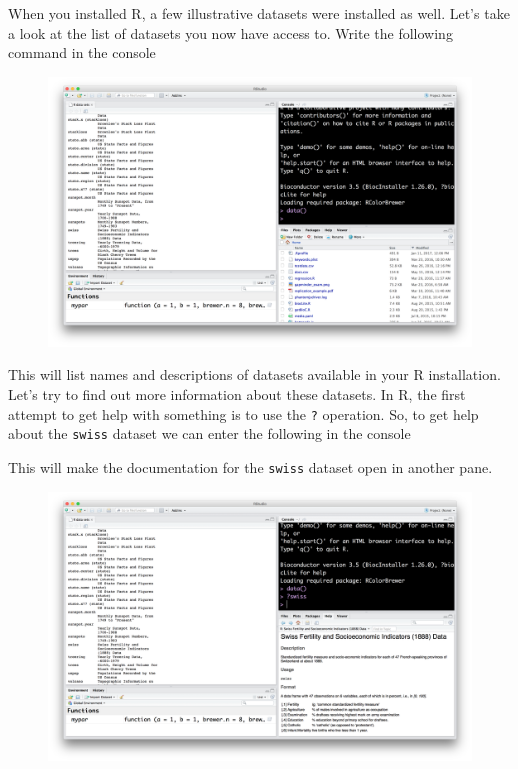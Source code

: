 \documentclass[]{article}
\theoremstyle{definition}
\theoremstyle{definition}
\theoremstyle{remark}
\begin{document}
When you installed R, a few illustrative datasets were installed as
well. Let's take a look at the list of datasets you now have access to.
Write the following command in the console

\begin{figure}[htbp]
\centering
\includegraphics{img/rstudio_data.png}
\caption{}
\end{figure}

This will list names and descriptions of datasets available in your R
installation. Let's try to find out more information about these
datasets. In R, the first attempt to get help with something is to use
the \texttt{?} operation. So, to get help about the \texttt{swiss}
dataset we can enter the following in the console

This will make the documentation for the \texttt{swiss} dataset open in
another pane.

\begin{figure}[htbp]
\centering
\includegraphics{img/rstudio_swiss.png}
\caption{}
\end{figure}
\end{document}
